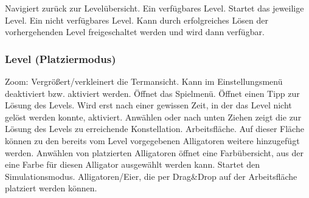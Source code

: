 \begin{requirements}
 Navigiert zurück zur Levelübersicht.
 Ein verfügbares Level. Startet das jeweilige Level.
 Ein nicht verfügbares Level. Kann durch erfolgreiches Lösen der vorhergehenden Level freigeschaltet werden und wird dann verfügbar.
\end{requirements}

\subsubsection{Level (Platziermodus)}

\begin{center}
\setlength\fboxsep{20pt}
\setlength\fboxrule{1pt}
\end{center}

\begin{requirements}
 Zoom: Vergrößert/verkleinert die Termansicht. Kann im Einstellungsmenü deaktiviert bzw. aktiviert werden.
 Öffnet das Spielmenü.
 Öffnet einen Tipp zur Lösung des Levels. Wird erst nach einer gewissen Zeit, in der das Level nicht gelöst werden konnte, aktiviert.
 Anwählen oder nach unten Ziehen zeigt die zur Lösung des Levels zu erreichende Konstellation.
 Arbeitsfläche. Auf dieser Fläche können zu den bereits vom Level vorgegebenen Alligatoren weitere hinzugefügt werden. Anwählen von platzierten Alligatoren öffnet eine Farbübersicht, aus der eine Farbe für diesen Alligator ausgewählt werden kann.
 Startet den Simulationsmodus.
 Alligatoren/Eier, die per Drag\&Drop auf der Arbeitsfläche platziert werden können.
\end{requirements}

